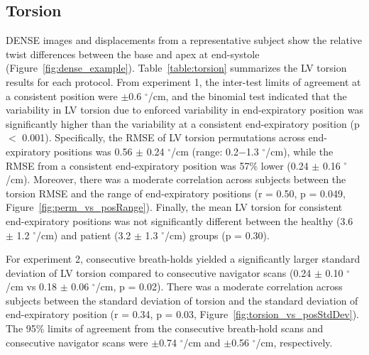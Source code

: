 \subsection{Torsion}
	DENSE images and displacements from a representative subject show the relative twist differences between the base and apex at end-systole (Figure~\ref{fig:dense_example}). Table~\ref{table:torsion} summarizes the LV torsion results for each protocol. From experiment 1, the inter-test limits of agreement at a consistent position were $\pm$0.6 $^{\circ}$/cm, and the binomial test indicated that the variability in LV torsion due to enforced variability in end-expiratory position was significantly higher than the variability at a consistent end-expiratory position (p $<$ 0.001). Specifically, the RMSE of LV torsion permutations across end-expiratory positions was 0.56 $\pm$ 0.24 $^{\circ}$/cm (range: 0.2$-$1.3 $^{\circ}$/cm), while the RMSE from a consistent end-expiratory position was 57\% lower (0.24 $\pm$ 0.16 $^{\circ}$/cm). Moreover, there was a moderate correlation across subjects between the torsion RMSE and the range of end-expiratory positions (r = 0.50, p = 0.049, Figure~\ref{fig:perm_vs_posRange}). Finally, the mean LV torsion for consistent end-expiratory positions was not significantly different between the healthy (3.6 $\pm$ 1.2 $^{\circ}$/cm) and patient (3.2 $\pm$ 1.3 $^{\circ}$/cm) groups (p = 0.30).
	
	For experiment 2, consecutive breath-holds yielded a significantly larger standard deviation of LV torsion compared to consecutive navigator scans (0.24 $\pm$ 0.10 $^{\circ}$/cm vs 0.18 $\pm$ 0.06 $^{\circ}$/cm, p = 0.02). There was a moderate correlation across subjects between the standard deviation of torsion and the standard deviation of end-expiratory position (r = 0.34, p = 0.03, Figure~\ref{fig:torsion_vs_posStdDev}). The 95\% limits of agreement from the consecutive breath-hold scans and consecutive navigator scans were $\pm$0.74 $^{\circ}$/cm and $\pm$0.56 $^{\circ}$/cm, respectively.

